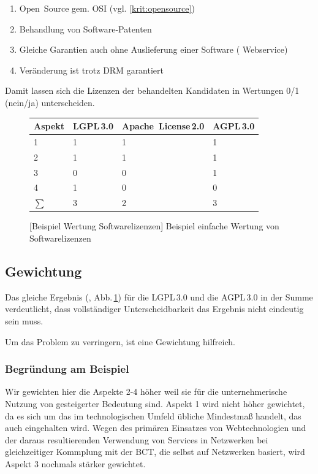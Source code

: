 \begin{enumerate} 		\setlength\itemsep{0em}\setlength\parskip{0em}\setlength\topsep{0em}\setlength\partopsep{0em}\setlength\parsep{0em}
\item Open~Source gem. OSI (vgl. \ref{krit:opensource})
\item Behandlung von Software-Patenten
\item Gleiche Garantien auch ohne Auslieferung einer Software (\zB{} Webservice)
\item Veränderung ist trotz \gls{DRM} garantiert
\end{enumerate}

Damit lassen sich die Lizenzen der behandelten Kandidaten in Wertungen 0/1 (nein/ja) unterscheiden.

\begin{figure}[!htp]
\centering
\begin{tabular}{l|lll}
Aspekt	& LGPL\,3.0 	& Apache~License\,2.0 & AGPL\,3.0 \\
\hline
\hline
1 		& 1	& 1	& 1	\\
\hline
2 		& 1	& 1	& 1	\\
\hline
3 		& 0	& 0	& 1	\\
\hline
4		& 1 & 0 & 0 \\
\hline
\hline
\(\sum\)& 3 & 2 & 3 \\
\end{tabular}
[Beispiel Wertung Softwarelizenzen]{\label{abb:wertung:oss} Beispiel einfache Wertung von Softwarelizenzen}
\end{figure}

\subsection{Gewichtung}

Das gleiche Ergebnis (, Abb.\,\ref{abb:wertung:oss}) für die LGPL\,3.0 und die AGPL\,3.0 in der Summe verdeutlicht,
dass vollständiger Unterscheidbarkeit das Ergebnis nicht eindeutig sein muss.

Um das Problem zu verringern, ist eine Gewichtung hilfreich.

\subsubsection*{Begründung am Beispiel}
Wir gewichten hier die Aspekte 2-4 höher weil sie für die unternehmerische Nutzung von gesteigerter Bedeutung sind.
Aspekt 1 wird nicht höher gewichtet, da es sich um das im technologischen Umfeld übliche Mindestmaß handelt, das auch eingehalten wird.
Wegen des primären Einsatzes von Webtechnologien und der daraus resultierenden Verwendung von Services in Netzwerken bei gleichzeitiger Kommplung mit der \gls{BCT}, die selbst auf Netzwerken basiert, wird Aspekt 3 nochmals stärker gewichtet.


